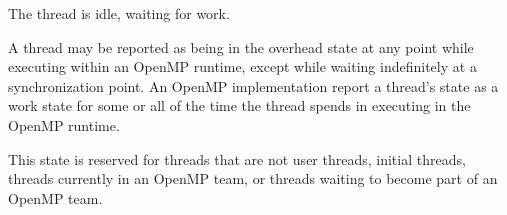 
\begin{description}
\item {}

  The thread is idle, waiting for work.

\item {}

  A thread may be reported as being in the overhead state at any point while
  executing within an OpenMP runtime, except while waiting indefinitely
  at a synchronization point.
  An OpenMP implementation report a thread's state as a work state for
  some or all of the time the thread spends in executing in the OpenMP runtime.

\item {}

  This state is reserved for threads that are not user threads,
  initial threads, threads currently in an OpenMP team, or threads
  waiting to become part of an OpenMP team.

\end{description}
